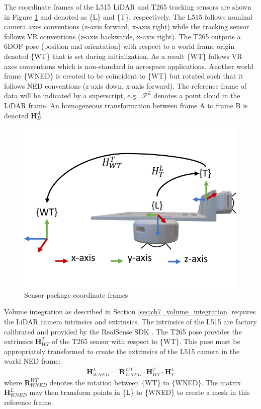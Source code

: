 The coordinate frames of the L515 LiDAR and T265 tracking sensors are shown in Figure \ref{fig:ch7_sensor_frames} and denoted as \{L\} and \{T\}, respectively. The L515 follows nominal camera axes conventions (z-axis forward, x-axis right) while the tracking sensor follows \acf{VR} conventions (z-axis backwards, x-axis right). The T265 outputs a 6DOF pose (position and orientation) with respect to a world frame origin denoted \{WT\} that is set during initialization. As a result \{WT\} follows \ac{VR} axes conventions which is non-standard in aerospace applications. Another world frame \{WNED\} is created to be coincident to \{WT\} but rotated such that it follows NED conventions (z-axis down, x-axis forward). The reference frame of data will be indicated by a superscript, e.g., $\mathcal{P}^{L}$ denotes a point cloud in the LiDAR frame. An homogeneous transformation between frame A to frame B is denoted $\mathbf{H}^A_B$.

\begin{figure}[!htb]
  \centering
  \includegraphics[page=1,clip,trim=0cm 1cm 0cm 1cm,width=.45\linewidth]{chapter_7_experiments/imgs/sensor_frames.pdf}
  \caption[Sensor package coordinate frames]{Sensor package coordinate frames}\label{fig:ch7_sensor_frames}
\end{figure}
Volume integration as described in Section \ref{sec:ch7_volume_integration} requires the LiDAR camera intrinsics and extrinsics. The intrinsics of the L515 are factory calibrated and provided by the RealSense SDK \cite{noauthor_github_2020-4}. The T265 pose provides the extrinsics $\mathbf{H}^{T}_{WT}$  of the T265 sensor with respect to \{WT\}. This pose must be appropriately transformed to create the extrinsics of the L515 camera in the world NED frame:
\begin{align*}
   \mathbf{H}^{L}_{WNED}  =  \mathbf{R}^{WT}_{WNED} \cdot \mathbf{H}^{T}_{WT} \cdot \mathbf{H}^{L}_{T}
\end{align*}
where $\mathbf{R}^{WT}_{WNED}$ denotes the rotation between \{WT\} to \{WNED\}. The matrix $\mathbf{H}^{L}_{WNED}$ may then transform points in \{L\} to \{WNED\} to create a mesh in this reference frame.

